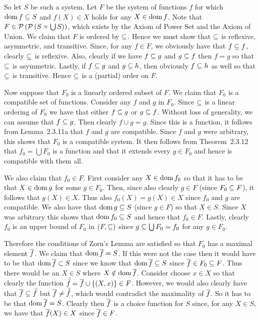 \begin{questions}
{{      So let $S$ be such a system.
      Let $F$ be the system of functions $f$ for which $\dom{f} \ss S$ and $f(X) \in X$ holds for any $X \in \dom{f}$.
      Note that $F \in \pset{\pset{S \times \bigcup S}}$, which exists by the Axiom of Power Set and the Axiom of Union.
      We claim that $F$ is ordered by $\ss$.
      Hence we must show that $\ss$ is reflexive, asymmetric, and transitive.
      Since, for any $f \in F$, we obviously have that $f \ss f$, clearly $\ss$ is reflexive.
      Also, clearly if we have $f \ss g$ and $g \ss f$ then $f=g$ so that $\ss$ is asymmetric.
      Lastly, if $f \ss g$ and $g \ss h$, then obviously $f \ss h$ as well so that $\ss$ is transitive.
      Hence $\ss$ is a (partial) order on $F$.

      Now suppose that $F_0$ is a linearly ordered subset of $F$.
      We claim that $F_0$ is a compatible set of functions.
      Consider any $f$ and $g$ in $F_0$.
      Since $\ss$ is a linear ordering of $F_0$ we have that either $f \ss g$ or $g \ss f$.
      Without loss of generality, we can assume that $f \ss g$.
      Then clearly $f \cup g = g$.
      Since this is a function, it follows from Lemma~2.3.11a that $f$ and $g$ are compatible.
      Since $f$ and $g$ were arbitrary, this shows that $F_0$ is a compatible system.
      It then follows from Theorem~2.3.12 that $f_0 = \bigcup F_0$ is a function and that it extends every $g \in F_0$ and hence is compatible with them all.

      We also claim that $f_0 \in F$.
      First consider any $X \in \dom{f_0}$ so that it has to be that $X \in \dom{g}$ for some $g \in F_0$.
      Then, since also clearly $g \in F$ (since $F_0 \ss F$), it follows that $g(X) \in X$.
      Thus also $f_0(X) = g(X) \in X$ since $f_0$ and $g$ are compatible.
      We also have that $\dom{g} \ss S$ (since $g \in F$) so that $X \in S$.
      Since $X$ was arbitrary this shows that $\dom{f_0} \ss S$ and hence that $f_0 \in F$.
      Lastly, clearly $f_0$ is an upper bound of $F_0$ in $(F, \ss)$ since $g \ss \bigcup F_0 = f_0$ for any $g \in F_0$.

      Therefore the conditions of Zorn's Lemma are satisfied so that $F_0$ has a maximal element $\fb$.
      We claim that $\dom{\fb} = S$.
      If this were not the case then it would have to be that $\dom{\fb} \pss S$ since we know that $\dom{\fb} \ss S$ since $\fb \in F_0 \ss F$.
      Thus there would be an $X \in S$ where $X \notin \dom{\fb}$.
      Consider choose $x \in X$ so that clearly the function $\fbb = \fb \cup \braces{(X, x)} \in F$.
      However, we would also clearly have that $\fb \ss \fbb$ but $\fb \neq \fbb$, which would contradict the maximality of $\fb$.
      So it has to be that $\dom{\fb} = S$.
      Clearly then $\fb$ is a choice function for $S$ since, for any $X \in S$, we have that $\fb(X) \in X$ since $\fb \in F$.
    }
  }


\end{questions}
